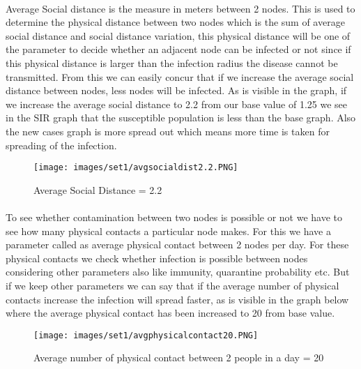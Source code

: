\documentclass[12pt, a4paper]{extarticle}
\begin{document}
    \newpage
    \paragraph{}
    Average Social distance is the measure in meters between 2 nodes. This is used to determine the physical distance between two nodes which is the sum of average social distance and social distance variation, this physical distance will be one of the parameter to decide whether an adjacent node can be infected or not since if this physical distance is larger than the infection radius the disease cannot be transmitted. From this we can easily concur that if we increase the average social distance between nodes, less nodes will be infected. As is visible in the graph, if we increase the average social distance to 2.2 from our base value of 1.25 we see in the SIR graph that the susceptible population is less than the base graph. Also the new cases graph is more spread out which means more time is taken for spreading of the infection.
    \vspace{0.2in}
    \begin{figure}[h]
        \centering
        \texttt{[image: images/set1/avgsocialdist2.2.PNG]}
        \caption{Average Social Distance = 2.2}
    \end{figure}
    
    \newpage
    \paragraph{}
    To see whether contamination between two nodes is possible or not we have to see how many physical contacts a particular node makes. For this we have a parameter called as average physical contact between 2 nodes per day. For these physical contacts we check whether infection is possible between nodes considering other parameters also like immunity, quarantine probability etc. But if we keep other parameters we can say that if the average number of physical contacts increase the infection will spread faster, as is visible in the graph below where the average physical contact has been increased to 20 from base value.
    \vspace{0.2in}
    \begin{figure}[h]
        \centering
        \texttt{[image: images/set1/avgphysicalcontact20.PNG]}
        \caption{Average number of physical contact between 2 people in a day = 20}
    \end{figure}
    
\end{document}
